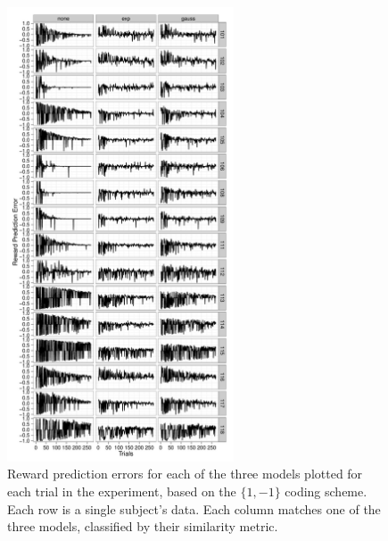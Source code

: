 \begin{figure}[tp]
    \includegraphics[width=0.6\textwidth]{f_rpe_gl}
    \centering
    \caption{Reward prediction errors for each of the three models plotted for each trial in the experiment, based on the $\{1,-1\}$ coding scheme.   Each row is a single subject's data.  Each column matches one of the three models, classified by their similarity metric.}
    \label{fig:rpegl}
\end{figure}

